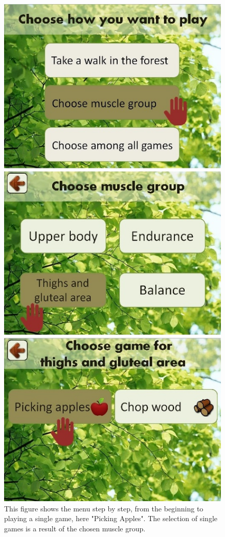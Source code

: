 \begin{figure} [H]
\centering
\includegraphics[scale=0.45]{menuEnglishStep1.jpg}
\caption[Menu review -  part one]{This figure shows the menu step by step, from the beginning to playing a single game, here "Picking Apples". The selection of single games is a result of the chosen muscle group.}
\label{menu1}
\end{figure}

